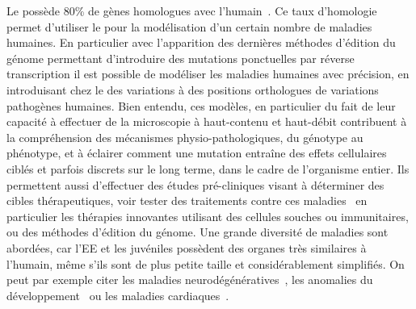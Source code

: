 \documentclass[\main/main.tex]{subfiles}
\begin{document}
%
Le \pz{} possède 80\% de gènes homologues avec l'humain~\cite{howe_2013}. 
Ce taux d'homologie permet d'utiliser le \pz{} pour la modélisation d'un certain nombre de maladies humaines.
En particulier avec l'apparition des dernières méthodes d'édition du génome permettant d'introduire des mutations ponctuelles par réverse transcription\cite{zhang_2017,molla_2019} il est possible de modéliser les maladies humaines avec précision, en introduisant chez le \pz{} des variations à des positions orthologues de variations pathogènes humaines.
Bien entendu, ces modèles, en particulier du fait de leur capacité à effectuer de la microscopie à haut-contenu et haut-débit contribuent à la compréhension des mécanismes physio\hyp{}pathologiques, du génotype au phénotype, et à éclairer comment une mutation entraîne des effets cellulaires ciblés et parfois discrets sur le long terme, dans le cadre de l'organisme entier.
Ils permettent aussi d'effectuer des études pré\hyp{}cliniques visant à déterminer des cibles thérapeutiques, voir tester des traitements contre ces maladies~\cite{vaz_2018,pitchai_2019,saleem_2018} en particulier les thérapies innovantes utilisant des cellules souches ou immunitaires, ou des méthodes d'édition du génome. 
%
Une grande diversité de maladies sont abordées, car l'EE et les juvéniles possèdent des organes très similaires à l'humain, même s'ils sont de plus petite taille et considérablement simplifiés. On peut par exemple citer les maladies neurodégénératives~\cite{fontana_2018}, les anomalies du développement~\cite{lovely_2016,sarmah_2016} ou les maladies cardiaques~\cite{brown_2016, walcott_2014}.
\end{document}
